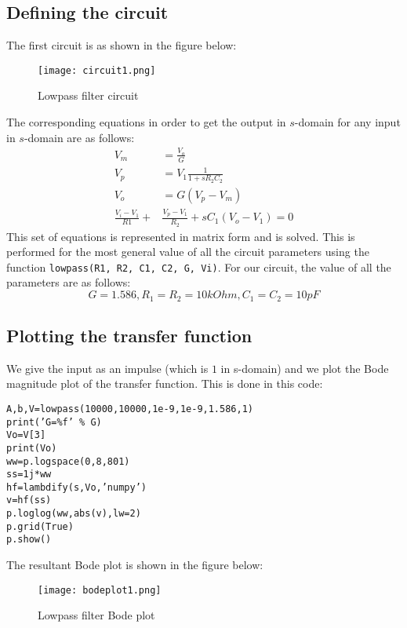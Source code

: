 \documentclass[11pt, a4paper]{article}
\begin{document}
\subsection{Defining the circuit}
The first circuit is as shown in the figure below:
\begin{figure}[H]
\centering
  \texttt{[image: circuit1.png]}  
\caption{Lowpass filter circuit}
\end{figure}
The corresponding equations in order to get the output in \(s\)-domain for any input in \(s\)-domain are as follows:
\begin{equation*}
\begin{split}
V_m &= \frac{V_o}{G}
\\ V_p &= V_1\frac{1}{1 + sR_2C_2}
\\ V_o &= G(V_p - V_m)
\\ \frac{V_i - V_1}{R1} +  &\frac{V_p - V_1}{R_2} + sC_1(V_o - V_1) = 0 
\end{split}
\end{equation*}
This set of equations is represented in matrix form and is solved. This is performed for the most general value of all the circuit parameters using the function \texttt{lowpass(R1, R2, C1, C2, G, Vi)}. For our circuit, the value of all the parameters are as follows:
\begin{equation*}
G = 1.586, R_1 = R_2 = 10kOhm, C_1 = C_2 = 10pF
\end{equation*}

\subsection{Plotting the transfer function}
We give the input as an impulse (which is \(1\) in s-domain) and we plot the Bode magnitude plot of the transfer function. This is done in this code:
\begin{verbatim}
A,b,V=lowpass(10000,10000,1e-9,1e-9,1.586,1)
print(’G=%f’ % G)
Vo=V[3]
print(Vo)
ww=p.logspace(0,8,801)
ss=1j*ww
hf=lambdify(s,Vo,’numpy’)
v=hf(ss)
p.loglog(ww,abs(v),lw=2)
p.grid(True)
p.show()
\end{verbatim}
The resultant Bode plot is shown in the figure below:
\begin{figure}[H]
\centering
  \texttt{[image: bodeplot1.png]}  
\caption{Lowpass filter Bode plot}
\end{figure}
\end{document}
